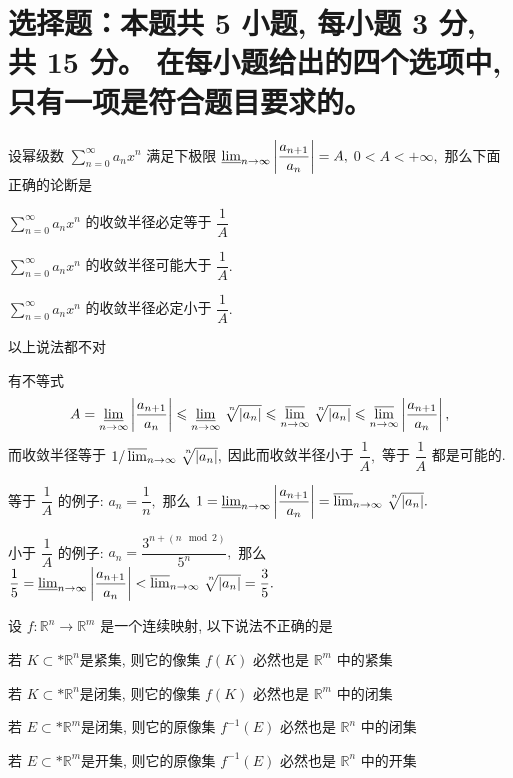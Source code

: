 \fi


\section{%
  选择题：本题共 5 小题, 每小题 3 分, 共 15 分。
  在每小题给出的四个选项中, 只有一项是符合题目要求的。
}


\begin{question}
  设幂级数 $\sum\limits_{n=0}^\infty a_n x^n$ 满足下极限 $\varliminf_{n\to\infty} \left\lvert \dfrac{a_{n+1}}{a_n} \right\rvert = A,$ $0 < A < +\infty,$ 那么下面正确的论断是 \paren[D]

  \begin{choices}
    \item $\sum\limits_{n=0}^\infty a_n x^n$ 的收敛半径必定等于 $\dfrac{1}{A}$
    \item $\sum\limits_{n=0}^\infty a_n x^n$ 的收敛半径可能大于 $\dfrac{1}{A}.$
    \item $\sum\limits_{n=0}^\infty a_n x^n$ 的收敛半径必定小于 $\dfrac{1}{A}.$
    \item 以上说法都不对
  \end{choices}
\end{question}

\begin{solution}
  有不等式
  $$A = \varliminf_{n\to\infty} \left\lvert \dfrac{a_{n+1}}{a_n} \right\rvert \leqslant \varliminf_{n\to\infty} \nroot[n]{\lvert a_n \rvert} \leqslant \varlimsup_{n\to\infty} \nroot[n]{\lvert a_n \rvert} \leqslant \varlimsup_{n\to\infty}  \left\lvert \dfrac{a_{n+1}}{a_n} \right\rvert,$$
  而收敛半径等于 $1 / \varlimsup_{n\to\infty} \nroot[n]{\lvert a_n \rvert},$ 因此而收敛半径小于 $\dfrac{1}{A},$ 等于 $\dfrac{1}{A}$ 都是可能的.

  等于 $\dfrac{1}{A}$ 的例子: $a_n = \dfrac{1}{n},$ 那么 $1 = \varliminf_{n\to\infty} \left\lvert \dfrac{a_{n+1}}{a_n} \right\rvert = \varlimsup_{n\to\infty} \nroot[n]{\lvert a_n \rvert}.$

  小于 $\dfrac{1}{A}$ 的例子: $a_n = \dfrac{3^{n + (n \mod 2)}}{5^n},$ 那么 $\dfrac{1}{5} = \varliminf_{n\to\infty} \left\lvert \dfrac{a_{n+1}}{a_n} \right\rvert < \varlimsup_{n\to\infty} \nroot[n]{\lvert a_n \rvert} = \dfrac{3}{5}.$
\end{solution}

\begin{question}
  设 $f: \mathbb{R}^n \to \mathbb{R}^m$ 是一个连续映射, 以下说法不正确的是 \paren[B]

  \begin{choices}
    \item 若 $K \subset* \mathbb{R}^n$是紧集, 则它的像集 $f(K)$ 必然也是 $\mathbb{R}^m$ 中的紧集
    \item 若 $K \subset* \mathbb{R}^n$是闭集, 则它的像集 $f(K)$ 必然也是 $\mathbb{R}^m$ 中的闭集
    \item 若 $E \subset* \mathbb{R}^m$是闭集, 则它的原像集 $f^{-1}(E)$ 必然也是 $\mathbb{R}^n$ 中的闭集
    \item 若 $E \subset* \mathbb{R}^m$是开集, 则它的原像集 $f^{-1}(E)$ 必然也是 $\mathbb{R}^n$ 中的开集
  \end{choices}
\end{question}

